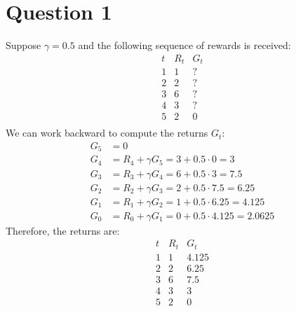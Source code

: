 \section{Question 1}
Suppose $\gamma = 0.5$ and the following sequence of rewards is received:
$$
\begin{array}{c|c|c}
    t & R_t & G_t \\ \hline
    1 & 1 & ? \\
    2 & 2 & ? \\
    3 & 6 & ? \\
    4 & 3 & ? \\
    5 & 2 & 0 \\
    \end{array}
$$
We can work backward to compute the returns $G_t$:
\begin{align*}
    G_5 &= 0 \\
    G_4 &= R_4 + \gamma G_5 = 3 + 0.5 \cdot 0 = 3 \\
    G_3 &= R_3 + \gamma G_4 = 6 + 0.5 \cdot 3 = 7.5 \\
    G_2 &= R_2 + \gamma G_3 = 2 + 0.5 \cdot 7.5 = 6.25 \\
    G_1 &= R_1 + \gamma G_2 = 1 + 0.5 \cdot 6.25 = 4.125 \\
    G_0 &= R_0 + \gamma G_1 = 0 + 0.5 \cdot 4.125 = 2.0625
\end{align*}
Therefore, the returns are:
$$
\begin{array}{c|c|c}
    t & R_t & G_t \\ \hline
    1 & 1 & 4.125 \\
    2 & 2 & 6.25 \\
    3 & 6 & 7.5 \\
    4 & 3 & 3 \\
    5 & 2 & 0
\end{array}
$$
    


    

